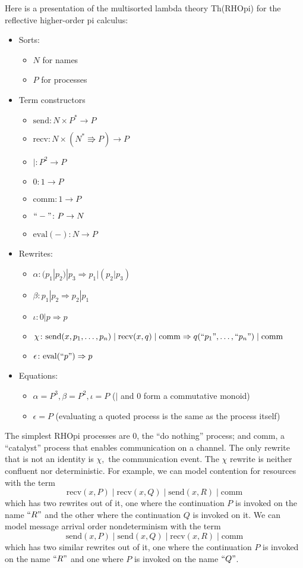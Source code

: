 \documentclass{article}
\newcommand{\maps}{\colon}
\newcommand{\send}{\mathrm{send}}
\newcommand{\recv}{\mathrm{recv}}
\newcommand{\comm}{\mathrm{comm}}
\renewcommand{\quote}[1]{``#1"}
\newcommand{\deref}[1]{\mathrm{eval}(#1)}
\begin{document}
Here is a presentation of the multisorted lambda theory Th(RHOpi) for the reflective higher-order pi calculus:
\begin{itemize}
  \item Sorts:
  \begin{itemize}
    \item $N$ for names
    \item $P$ for processes
  \end{itemize}
  \item Term constructors
  \begin{itemize}
    \item $\send\maps N \times P^* \to P$
    \item $\recv\maps N \times (N^* \Rrightarrow P) \to P$
    \item $|\maps P^2 \to P$
    \item $0\maps 1 \to P$
    \item $\comm\maps 1 \to P$
    \item $\quote{-}\maps P \to N$
    \item $\deref{-}\maps N \to P$
  \end{itemize}
  \item Rewrites:
  \begin{itemize}
    \item $\alpha\maps (p_1 | p_2) | p_3 \Rightarrow p_1 | (p_2 | p_3)$
    \item $\beta\maps p_1 | p_2 \Rightarrow p_2 | p_1$
    \item $\iota\maps 0 | p \Rightarrow p$
    \item $\chi\maps \send(x, p_1, \ldots, p_n) \;|\; \recv(x, q) \;|\; \comm \Rightarrow q(\quote{p_1}, \ldots, \quote{p_n}) \;|\; \comm$
    \item $\epsilon\maps \deref{\quote{p}} \Rightarrow p$
  \end{itemize}
  \item Equations:
  \begin{itemize}
    \item $\alpha = P^3, \beta = P^2, \iota = P$ ($|$ and 0 form a commutative monoid)
    \item $\epsilon = P$ (evaluating a quoted process is the same as the process itself)
  \end{itemize}
\end{itemize}

The simplest RHOpi processes are 0, the ``do nothing'' process; and comm, a ``catalyst'' process that enables communication on a channel.  The only rewrite that is not an identity is $\chi,$ the communication event.  The $\chi$ rewrite is neither confluent nor deterministic.  For example, we can model contention for resources with the term
\[ \recv(x, P)\;|\;\recv(x, Q)\;|\;\send(x,R)\;|\;\comm \]
which has two rewrites out of it, one where the continuation $P$ is invoked on the name $\quote{R}$ and the other where the continuation $Q$ is invoked on it.  We can model message arrival order nondeterminism with the term
\[ \send(x, P)\;|\;\send(x, Q)\;|\;\recv(x,R)\;|\;\comm \]
which has two similar rewrites out of it, one where the continuation $P$ is invoked on the name $\quote{R}$ and one where $P$ is invoked on the name $\quote{Q}$.
\end{document}
